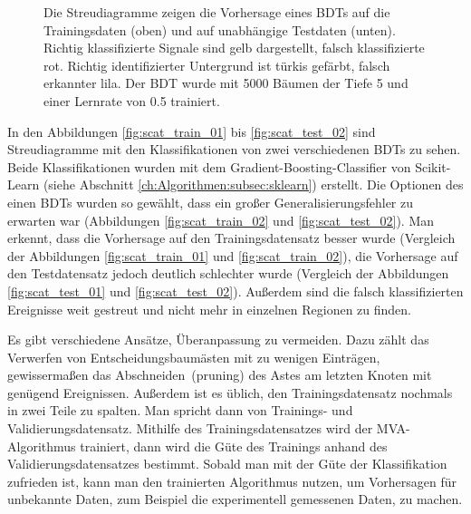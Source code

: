 \begin{figure}[tbp]
\centering     %
{}
\parbox[b]{12cm}{
\caption{Die Streudiagramme zeigen die Vorhersage eines BDTs auf die Trainingsdaten (oben) und auf unabh\"angige Testdaten (unten). Richtig klassifizierte Signale sind gelb dargestellt, falsch klassifizierte rot. Richtig identifizierter Untergrund ist t\"urkis gef\"arbt, falsch erkannter lila. Der BDT wurde mit \num{5000} B\"aumen der Tiefe \num{5} und einer Lernrate von \num{0,5} trainiert.}
}
\label{fig:boosting}
\end{figure}

In den Abbildungen \ref{fig:scat_train_01} bis \ref{fig:scat_test_02} sind Streudiagramme mit den Klassifikationen von zwei verschiedenen BDTs zu sehen. Beide Klassifikationen wurden mit dem Gradient-Boosting-Classifier von Scikit-Learn (siehe Abschnitt \ref{ch:Algorithmen:subsec:sklearn}) erstellt. Die Optionen des einen BDTs wurden so gew\"ahlt, dass ein gro\ss er Generalisierungsfehler zu erwarten war (Abbildungen \ref{fig:scat_train_02} und \ref{fig:scat_test_02}). Man erkennt, dass die Vorhersage auf den Trainingsdatensatz besser wurde (Vergleich der Abbildungen \ref{fig:scat_train_01} und \ref{fig:scat_train_02}), die Vorhersage auf den Testdatensatz jedoch deutlich schlechter wurde (Vergleich der Abbildungen \ref{fig:scat_test_01} und \ref{fig:scat_test_02}). Au\ss erdem sind die falsch klassifizierten Ereignisse weit gestreut und nicht mehr in einzelnen Regionen zu finden.

Es gibt verschiedene Ans\"atze, \"Uberanpassung zu vermeiden. Dazu z\"ahlt das Verwerfen von Entscheidungsbaum\"asten mit zu wenigen Eintr\"agen, gewisserma\ss en das \glqq Abschneiden\grqq~(pruning) des Astes am letzten Knoten mit gen\"ugend Ereignissen. Au\ss erdem ist es \"ublich, den Trainingsdatensatz nochmals in zwei Teile zu spalten. Man spricht dann von Trainings- und Validierungsdatensatz. Mithilfe des Trainingsdatensatzes wird der MVA-Algorithmus trainiert, dann wird die G\"ute des Trainings anhand des Validierungsdatensatzes bestimmt. Sobald man mit der G\"ute der Klassifikation zufrieden ist, kann man den trainierten Algorithmus nutzen, um Vorhersagen f\"ur unbekannte Daten, zum Beispiel die experimentell gemessenen Daten, zu machen.


